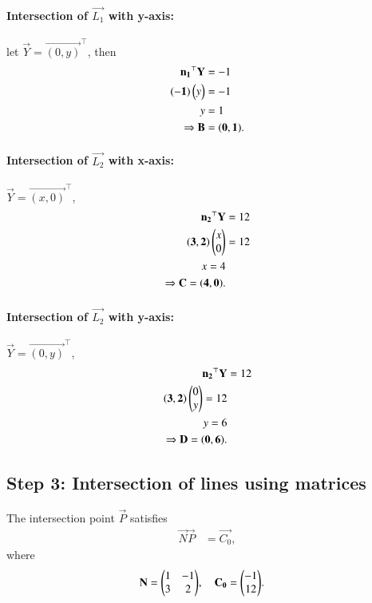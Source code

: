 \documentclass[journal]{IEEEtran}
\begin{document}
\paragraph{Intersection of $\vec{L_1}$ with y-axis:} let $\vec{Y} = \vec{(0,y)}^\top$, then
\begin{align}
\mathbf{n_1}^\top \mathbf{Y} &= -1 \notag\\
\mathbf{(-1)} \begin{pmatrix}y\end{pmatrix} &= -1 \notag\\
y &= 1 \notag\\
\Rightarrow \mathbf{B} &= \mathbf{(0,1)}. 
\end{align}

\paragraph{Intersection of $\vec{L_2}$ with x-axis:} $\vec{Y} = \vec{(x,0)}^\top$,
\begin{align}
\mathbf{n_2}^\top \mathbf{Y} &= 12 \notag\\
\mathbf{(3,2)} \begin{pmatrix}x\\0\end{pmatrix} &= 12 \notag\\
x = 4 \notag\\
\Rightarrow \mathbf{C} = \mathbf{(4,0)}. 
\end{align}

\paragraph{Intersection of $\vec{L_2}$ with y-axis:} $\vec{Y} = \vec{(0,y)}^\top$,
\begin{align}
\mathbf{n_2}^\top \mathbf{Y} &= 12 \notag\\
\mathbf{(3,2)} \begin{pmatrix}0\\y\end{pmatrix} = 12 \notag\\
y = 6 \notag\\
\Rightarrow \mathbf{D} = \mathbf{(0,6)}. 
\end{align}

\subsection*{Step 3: Intersection of lines using matrices}

The intersection point $\vec{P}$ satisfies
\begin{align}
\vec{N} \vec{P} &= \vec{C_0}, 
\end{align}
where
\begin{align}
\mathbf{N} &= \mathbf{\begin{pmatrix}1 & -1 \\ 3 & 2\end{pmatrix}}, \quad
\mathbf{C_0} = \mathbf{\begin{pmatrix}-1 \\ 12\end{pmatrix}}. 
\end{align}
\end{document}
